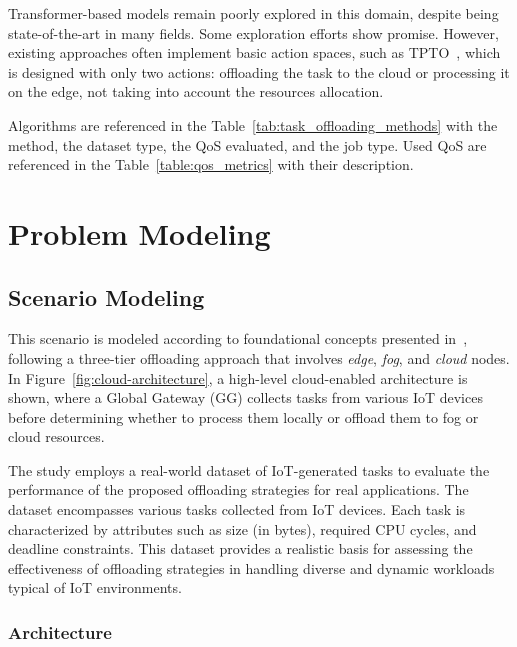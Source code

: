 \documentclass{svproc}
\begin{document}
Transformer-based models remain poorly explored in this domain, despite being state-of-the-art in many fields. Some exploration efforts show promise. However, existing approaches often implement basic action spaces, such as TPTO~\cite{gholipour_tpto_2023}, which is designed with only two actions: offloading the task to the cloud or processing it on the edge, not taking into account the resources allocation.

Algorithms are referenced in the Table~\ref{tab:task_offloading_methods} with the method, the dataset type, the QoS evaluated, and the job type. Used QoS are referenced in the Table~\ref{table:qos_metrics} with their description.

\section{Problem Modeling}\label{sec:problem_modeling}

\subsection{Scenario Modeling}\label{sec:scenario_modeling}

This scenario is modeled according to foundational concepts presented in~\cite{aazam_cloud_2022, bukhari_intelligent_2022, jazayeri_autonomous_2021}, following a three-tier offloading approach that involves \textit{edge}, \textit{fog}, and \textit{cloud} nodes. In Figure~\ref{fig:cloud-architecture}, a high-level cloud-enabled architecture is shown, where a Global Gateway (GG) collects tasks from various IoT devices before determining whether to process them locally or offload them to fog or cloud resources.

The study employs a real-world dataset of IoT-generated tasks to evaluate the performance of the proposed offloading strategies for real applications. The dataset encompasses various tasks collected from IoT devices. Each task is characterized by attributes such as size (in bytes), required CPU cycles, and deadline constraints. This dataset provides a realistic basis for assessing the effectiveness of offloading strategies in handling diverse and dynamic workloads typical of IoT environments.



\subsubsection{Architecture}\label{subsec:architecture}
\end{document}
